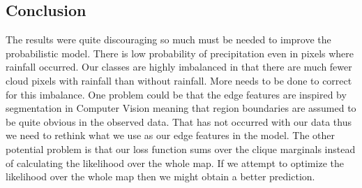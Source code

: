 \subsection{Conclusion}

The results were quite discouraging so much must be needed to improve the probabilistic model. There is low probability of precipitation even in pixels where rainfall occurred. Our classes are highly imbalanced in that there are much fewer cloud pixels with rainfall than without rainfall. More needs to be done to correct for this imbalance. One problem could be that the edge features are inspired by segmentation in Computer Vision meaning that region boundaries are assumed to be quite obvious in the observed data. That has not occurred with our data thus we need to rethink what we use as our edge features in the model. The other potential problem is that our loss function sums over the clique marginals instead of calculating the likelihood over the whole map. If we attempt to optimize the likelihood over the whole map then we might obtain a better prediction. 


